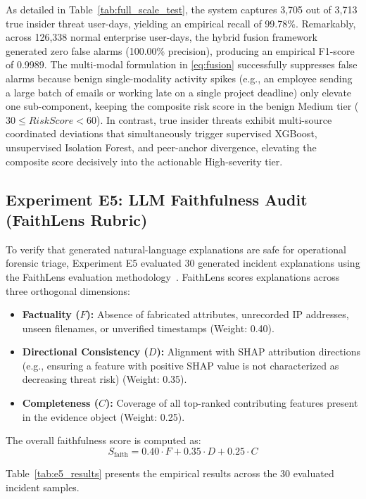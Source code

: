 \documentclass[conference]{IEEEtran}
\begin{document}
As detailed in Table~\ref{tab:full_scale_test}, the system captures 3,705 out of 3,713 true insider threat user-days, yielding an empirical recall of 99.78\%. Remarkably, across 126,338 normal enterprise user-days, the hybrid fusion framework generated zero false alarms (100.00\% precision), producing an empirical F1-score of 0.9989. The multi-modal formulation in \eqref{eq:fusion} successfully suppresses false alarms because benign single-modality activity spikes (e.g., an employee sending a large batch of emails or working late on a single project deadline) only elevate one sub-component, keeping the composite risk score in the benign Medium tier ($30 \le RiskScore < 60$). In contrast, true insider threats exhibit multi-source coordinated deviations that simultaneously trigger supervised XGBoost, unsupervised Isolation Forest, and peer-anchor divergence, elevating the composite score decisively into the actionable High-severity tier.

\subsection{Experiment E5: LLM Faithfulness Audit (FaithLens Rubric)}
\label{subsec:e5}
To verify that generated natural-language explanations are safe for operational forensic triage, Experiment E5 evaluated 30 generated incident explanations using the FaithLens evaluation methodology~\cite{si2024faithlens}. FaithLens scores explanations across three orthogonal dimensions:
\begin{itemize}
    \item \textbf{Factuality ($F$):} Absence of fabricated attributes, unrecorded IP addresses, unseen filenames, or unverified timestamps (Weight: 0.40).
    \item \textbf{Directional Consistency ($D$):} Alignment with SHAP attribution directions (e.g., ensuring a feature with positive SHAP value is not characterized as decreasing threat risk) (Weight: 0.35).
    \item \textbf{Completeness ($C$):} Coverage of all top-ranked contributing features present in the evidence object (Weight: 0.25).
\end{itemize}
The overall faithfulness score is computed as:
\begin{equation}
    S_{\text{faith}} = 0.40 \cdot F + 0.35 \cdot D + 0.25 \cdot C
    \label{eq:faithlens}
\end{equation}

Table~\ref{tab:e5_results} presents the empirical results across the 30 evaluated incident samples.
\end{document}
